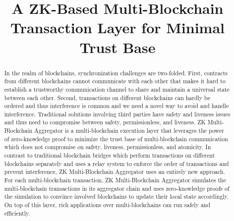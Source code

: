 \documentclass[pageno]{jpaper}
\begin{document}
\title{A ZK-Based Multi-Blockchain Transaction Layer for Minimal Trust Base}
\newcommand{\dprotocol}{ZK Multi-Blockchain Aggregator }
\date{}
\maketitle
\thispagestyle{empty}
\begin{abstract}
In the realm of blockchains, synchronization challenges are two-folded. First, contracts from different blockchains cannot communicate with each other that makes it hard to establish a trustworthy communication channel to share and maintain a universal state between each other. Second, transactions on different blockchains can hardly be ordered and thus interference is common and we need a novel way to avoid and handle interference. Traditional solutions involving third parties have safety and liveness issues and thus need to compromise between safety, permissionless, and liveness.  \dprotocol is a multi-blockchain execution layer that leverages the power of zero-knowledge proof to minimize the trust base of multi-blockchain communication which does not compromise on safety, liveness, permissionless, and atomicity. In contrast to traditional blockchain bridges which perform transactions on different blockchains separately and uses a relay system to enforce the order of transactions and prevent interference, \dprotocol uses an entirely new approach. For each multi-blockchain transaction, \dprotocol simulates the multi-blockchain transactions in its aggregator chain and uses zero-knowledge proofs of the simulation to convince involved blockchains to update their local state accordingly.  On top of this layer, rich applications over multi-blockchains can run safely and efficiently.
\end{abstract}










\end{document}

